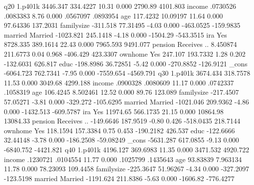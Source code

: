 q20          {\VBAR}
     1.p401k {\VBAR}   3446.347   334.4227    10.31   0.000      2790.89    4101.803
      income {\VBAR}   .0730526   .0083383     8.76   0.000     .0567097    .0893954
         age {\VBAR}   117.4232   10.09197    11.64   0.000     97.64336    137.2031
  familysize {\VBAR}   -311.518   77.31495    -4.03   0.000    -463.0525   -159.9835
             {\VBAR}
     married {\VBAR}
    Married  {\VBAR}  -1023.821   245.1418    -4.18   0.000     -1504.29   -543.3515
             {\VBAR}
         ira {\VBAR}
        Yes  {\VBAR}   8728.335   389.1614    22.43   0.000     7965.593    9491.077
             {\VBAR}
     pension {\VBAR}
Receives ..  {\VBAR}   8.450874   211.6773     0.04   0.968     -406.429    423.3307
             {\VBAR}
     ownhome {\VBAR}
        Yes  {\VBAR}    247.107   193.7332     1.28   0.202    -132.6031     626.817
        educ {\VBAR}  -198.8986   36.72851    -5.42   0.000    -270.8852   -126.9121
       _cons {\VBAR}  -6064.723   762.7341    -7.95   0.000    -7559.654   -4569.791
q30          {\VBAR}
     1.p401k {\VBAR}   3674.434   318.7578    11.53   0.000      3049.68    4299.188
      income {\VBAR}   .0900328   .0080609    11.17   0.000     .0742337    .1058319
         age {\VBAR}   106.4245   8.502461    12.52   0.000        89.76     123.089
  familysize {\VBAR}  -217.4507   57.05271    -3.81   0.000     -329.272   -105.6295
             {\VBAR}
     married {\VBAR}
    Married  {\VBAR}  -1021.046   209.9362    -4.86   0.000    -1432.513   -609.5787
             {\VBAR}
         ira {\VBAR}
        Yes  {\VBAR}   11974.65   566.1735    21.15   0.000     10864.98    13084.33
             {\VBAR}
     pension {\VBAR}
Receives ..  {\VBAR}  -149.6646   187.9519    -0.80   0.426    -518.0435    218.7144
             {\VBAR}
     ownhome {\VBAR}
        Yes  {\VBAR}   118.1594   157.3384     0.75   0.453    -190.2182     426.537
        educ {\VBAR}  -122.6666   32.44148    -3.78   0.000    -186.2508   -59.08249
       _cons {\VBAR}  -5631.287   617.0855    -9.13   0.000    -6840.752   -4421.821
q40          {\VBAR}
     1.p401k {\VBAR}   4196.127   369.6983    11.35   0.000     3471.532    4920.722
      income {\VBAR}   .1230721   .0104554    11.77   0.000     .1025799    .1435643
         age {\VBAR}   93.83839   7.963134    11.78   0.000     78.23093    109.4458
  familysize {\VBAR}  -225.3647   51.96267    -4.34   0.000    -327.2097   -123.5198
             {\VBAR}
     married {\VBAR}
    Married  {\VBAR}  -1191.624   211.8386    -5.63   0.000     -1606.82   -776.4277
